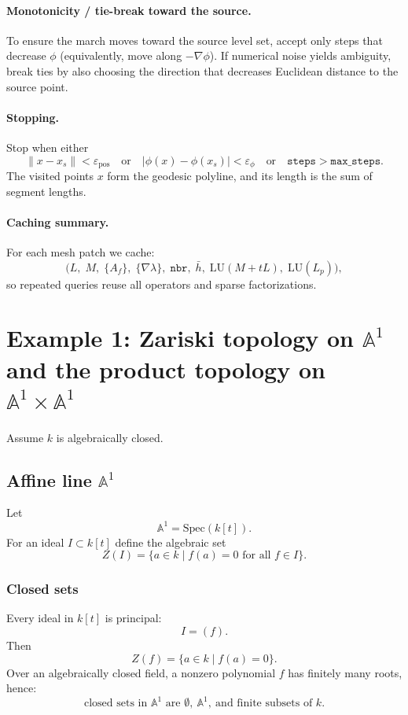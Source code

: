 \documentclass[12pt,a4paper]{article}
\theoremstyle{plain}
\theoremstyle{definition}
\begin{document}
	\paragraph{Monotonicity / tie-break toward the source.}
	To ensure the march moves toward the source level set, accept only steps that decrease \(\phi\)
	(equivalently, move along \(-\nabla\phi\)). If numerical noise yields ambiguity, break ties by
	also choosing the direction that decreases Euclidean distance to the source point.
	
	\paragraph{Stopping.}
	Stop when either
	\[
	\|x - x_s\| < \varepsilon_{\mathrm{pos}}
	\quad\text{or}\quad
	|\phi(x)-\phi(x_s)| < \varepsilon_{\phi}
	\quad\text{or}\quad
	\texttt{steps}>\texttt{max\_steps}.
	\]
	The visited points \(x\) form the geodesic polyline, and its length is the sum of segment lengths.
	
	\paragraph{Caching summary.}
	For each mesh patch we cache:
	\[
	\bigl(L,\; M,\; \{A_f\},\; \{\nabla\lambda\},\; \texttt{nbr},\; \bar{h},\;
	\mathrm{LU}(M+tL),\; \mathrm{LU}(L_p)\bigr),
	\]
	so repeated queries reuse all operators and sparse factorizations.
	
	
	\section{Example 1: Zariski topology on $\mathbb A^1$ and the product topology on $\mathbb A^1\times \mathbb A^1$}
	
	Assume $k$ is algebraically closed.
	
	\subsection{Affine line $\mathbb A^1$}
	
	Let
	\[
	\mathbb A^1=\mathrm{Spec}(k[t]).
	\]
	For an ideal $I\subset k[t]$ define the algebraic set
	\[
	Z(I)=\{a\in k \mid f(a)=0 \text{ for all } f\in I\}.
	\]
	
	\subsubsection{Closed sets}
	
	Every ideal in $k[t]$ is principal:
	\[
	I=(f).
	\]
	Then
	\[
	Z(f)=\{a\in k \mid f(a)=0\}.
	\]
	Over an algebraically closed field, a nonzero polynomial $f$ has finitely many roots, hence:
	\[
	\text{closed sets in } \mathbb A^1 \text{ are } \emptyset,\ \mathbb A^1,\ \text{and finite subsets of }k.
	\]
	
\end{document}
